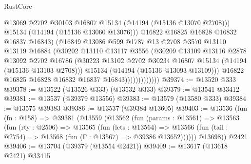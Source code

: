 \begin{lexlean}{RustCore}
\begin{coremodule}
                                @13069
                                @2702
                                @30103
                                @16807
                                @15134
                                (@14194 (@15136 @13070 @2708)))
                              @15134
                              (@14194 (@15136 @13060 @13076)))
                            @16822
                            @16825
                            @16828
                            @16832
                            @16837
                            @16843)
                          (@16849
                            @13086
                            @599
                            @1787
                            @13
                            @2708
                            @3570
                            @13110
                            @13119
                            @16884
                            (@30202
                              @13110
                              @13117
                              @3556
                              (@30209
                                @13109
                                @13116
                                @2878
                                @13092
                                @2702
                                @16786
                                (@30223
                                  @13102
                                  @2702
                                  @30234
                                  @16807
                                  @15134
                                  (@14194 (@15136 @13103 @2708)))
                                @15134
                                (@14194 (@15136 @13093 @13109)))
                              @16822
                              @16825
                              @16828
                              @16832
                              @16837
                              @16843)))))))))))))
@39374 := @13520 @333
@39378 := @13522 (@13526 @333) (@13532 @333)
@39379 := @13541 @33412
@39381 := @13537 (@39379 @13556)
@39383 := @13579 (@13580 @333)
@39384 := @13575 @39383
@39386 := @13537 (@39384 @13605)
@39403 := @13536
    (fun (fn : @158) =>
    @39381
      (@13559
        (@13562
          (fun (params : @13561) =>
          @13563
            (fun (rty : @2506) =>
            @13565
              (fun (lets : @13564) =>
              @13566 (fun (tail : @2754) => @13568 (fun (Γ : @13567) => @39386 @13652))))))
        @13698))
    @2421
@39406 := @13704 (@39379 (@13554 @2421))
@39409 := @13617 (@13618 @2421) @33415

\end{coremodule}
\end{lexlean}
